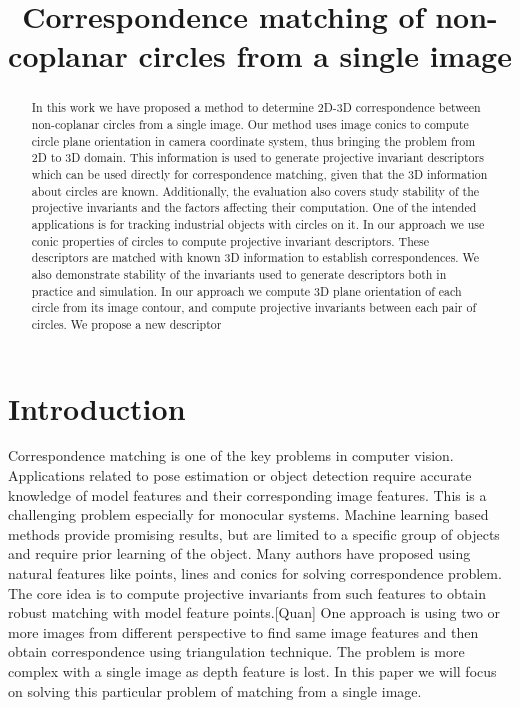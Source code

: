\documentclass{bmvc2k}
\title{Correspondence matching of non-coplanar circles from a single image}
\begin{document}
\maketitle

\begin{abstract}
In this work we have proposed a method to determine 2D-3D correspondence between non-coplanar circles from a single image.
Our method uses image conics to compute circle plane orientation in camera coordinate system, thus bringing the problem from 2D to 3D domain. This information is used to generate projective invariant descriptors which can be used directly for correspondence matching, given that the 3D information about circles are known. Additionally, the evaluation also covers study stability of the projective invariants and the factors affecting their computation. One of the intended applications is for tracking industrial objects with circles on it. In our approach we use conic properties of circles to compute projective invariant descriptors. These descriptors are matched with known 3D information to establish correspondences. We also demonstrate stability of the invariants used to generate descriptors both in practice and simulation. 
In our approach we compute 3D plane orientation of each circle from its image contour, and compute projective invariants between each pair of circles. We propose a new descriptor 

\end{abstract}

\section{Introduction}
\label{sec:intro}
Correspondence matching is one of the key problems in computer vision. Applications related to pose estimation or object detection require accurate knowledge of model features and their corresponding image features. This is a challenging problem especially for monocular systems. Machine learning based methods \cite{Hartley00} provide promising results, but are limited to a specific group of objects and require prior learning of the object. Many authors have proposed using natural features like points, lines and conics for solving correspondence problem. The core idea is to compute projective invariants from such features to obtain robust matching with model feature points.[Quan] One approach is using two or more images from different perspective to find same image features and then obtain correspondence using triangulation technique. The problem is more complex with a single image as depth feature is lost. In this paper we will focus on solving this particular problem of matching from a single image. 
\end{document}
